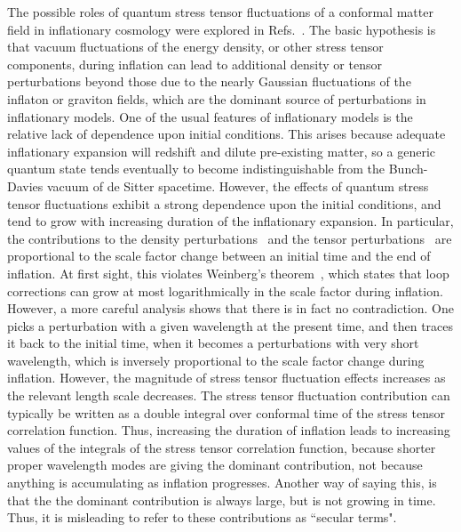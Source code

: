 \documentclass[preprint,prd,showpacs,superscriptaddress]{revtex4}
\begin{document}
The possible roles of quantum stress tensor fluctuations of a conformal matter field in inflationary cosmology were explored in
Refs.~\cite{WKF07,FMNWW10,WHFN11}. The basic hypothesis is that vacuum fluctuations of the energy
density, or other stress tensor components, during inflation can lead to additional density or tensor 
perturbations beyond those due to the nearly Gaussian fluctuations of the inflaton or graviton fields, which are 
the dominant source of perturbations in inflationary models.  One of the usual
features of inflationary models is the relative lack of dependence upon initial conditions. This arises because adequate
inflationary expansion will redshift and dilute pre-existing matter, so a generic quantum state tends eventually to become
indistinguishable from the Bunch-Davies vacuum of de Sitter spacetime. However, the effects of quantum stress tensor 
fluctuations exhibit a strong dependence upon the initial conditions, and tend to grow with increasing duration of the
inflationary expansion. In particular, the contributions to the density perturbations~\cite{WKF07,FMNWW10} and the
tensor perturbations~\cite{WHFN11} are proportional to the scale factor change between an initial time and the end
of inflation. At first sight, this violates Weinberg's theorem~\cite{W-thm}, which states that loop corrections can grow at 
most logarithmically in the scale factor during inflation. However, a more careful analysis shows that there is in fact no
contradiction. One picks a perturbation with a given wavelength at the present time, and then traces it back to the
initial time, when it becomes a perturbations with very short wavelength, which is inversely proportional to the scale 
factor change during inflation.
However, the magnitude of stress tensor fluctuation effects increases as the relevant length scale decreases. 
The stress tensor fluctuation contribution can
typically be written as a double integral over conformal time of the  stress tensor correlation function.
Thus, increasing the
duration of inflation leads to increasing values of the integrals of the  stress tensor correlation function, because shorter
proper wavelength modes are giving the dominant contribution, not because anything is accumulating as inflation
progresses. Another way of saying this, is that the the dominant contribution is always large, but is not growing in time.
Thus, it is misleading to refer to these contributions as ``secular terms".
\end{document}
